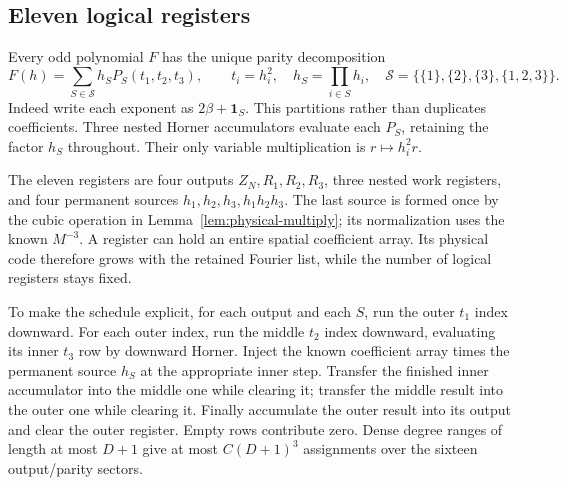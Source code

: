 \documentclass[11pt,a4paper]{amsart}
\theoremstyle{definition}
\theoremstyle{remark}
\numberwithin{equation}{section}
\begin{document}
\subsection{Eleven logical registers}
Every odd polynomial $F$ has the unique parity decomposition
\begin{equation}\label{eq:parity-decomposition}
 F(h)=\sum_{S\in\mathcal S}h_S P_S(t_1,t_2,t_3),\qquad
 t_i=h_i^2,\quad h_S=\prod_{i\in S}h_i,\quad
 \mathcal S=\{\{1\},\{2\},\{3\},\{1,2,3\}\}.
\end{equation}
Indeed write each exponent as $2\beta+\mathbf1_S$. This partitions rather
than duplicates coefficients.  Three nested Horner accumulators evaluate
each $P_S$, retaining the factor $h_S$ throughout. Their only variable
multiplication is $r\mapsto h_i^2r$.

The eleven registers are four outputs $Z_N,R_1,R_2,R_3$, three nested work
registers, and four permanent sources $h_1,h_2,h_3,h_1h_2h_3$. The last
source is formed once by the cubic operation in
Lemma~\ref{lem:physical-multiply}; its normalization uses the known $M^{-3}$.
A register can hold an entire spatial coefficient array. Its physical code
therefore grows with the retained Fourier list, while the number of logical
registers stays fixed.

To make the schedule explicit, for each output and each $S$, run the outer
$t_1$ index downward. For each outer index, run the middle $t_2$ index
downward, evaluating its inner $t_3$ row by downward Horner. Inject the
known coefficient array times the permanent source $h_S$ at the appropriate
inner step. Transfer the finished inner accumulator into the middle one
while clearing it; transfer the middle result into the outer one while
clearing it. Finally accumulate the outer result into its output and clear
the outer register. Empty rows contribute zero. Dense degree ranges of
length at most $D+1$ give at most $C(D+1)^3$ assignments over the sixteen
output/parity sectors.
\end{document}
